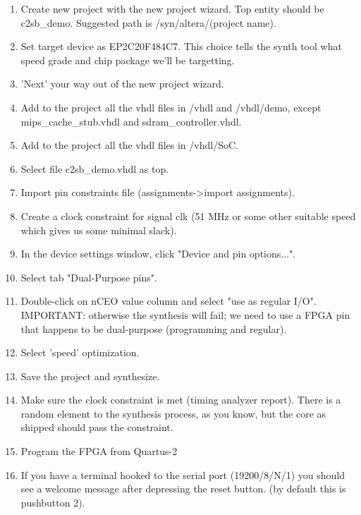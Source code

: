     \begin{enumerate}
        \item Create new project with the new project wizard.
            Top entity should be c2sb\_demo.
            Suggested path is /syn/altera/(project name).
        \item Set target device as EP2C20F484C7.
            This choice tells the synth tool what speed grade and chip package
            we'll be targetting.
        \item 'Next' your way out of the new project wizard.
        \item Add to the project all the vhdl files in /vhdl and /vhdl/demo, 
              except mips\_cache\_stub.vhdl and sdram\_controller.vhdl.
        \item Add to the project all the vhdl files in /vhdl/SoC. 
        \item Select file c2sb\_demo.vhdl as top.
        \item Import pin constraints file (assignments-\textgreater import assignments).
        \item Create a clock constraint for signal clk (51 MHz or some other
            suitable speed which gives us some minimal slack).
        \item In the device settings window, click "Device and pin options...".
        \item Select tab "Dual-Purpose pins".
        \item Double-click on nCEO value column and select "use as regular I/O".
            IMPORTANT: otherwise the synthesis will fail; we need to use a FPGA
            pin that happens to be dual-purpose (programming and regular).
        \item Select 'speed' optimization.
        \item Save the project and synthesize.
        \item Make sure the clock constraint is met (timing analyzer report).
            There is a random element to the synthesis process, as you know,
            but the core as shipped should pass the constraint.
        \item Program the FPGA from Quartus-2
        \item If you have a terminal hooked to the serial port (19200/8/N/1) you
            should see a welcome message after depressing the reset button.
            (by default this is pushbutton 2).
    \end{enumerate}
    
